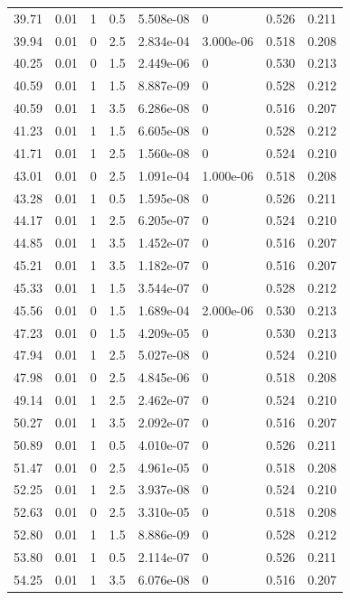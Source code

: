 \documentclass[preview]{standalone}
\begin{document}
{{{\begin{tabular}{L{1.2cm}C{1.2cm} C{0.3cm}C{0.5cm} C{1.4cm}C{1.4cm} C{1.4cm}C{1.4cm}}
  39.71  &  0.01  & 1     & 0.5 &  5.508e-08  & 0  & 0.526 &  0.211   \\ 
  39.94  &  0.01  & 0     & 2.5 &  2.834e-04  & 3.000e-06  & 0.518 &  0.208   \\ 
  40.25  &  0.01  & 0     & 1.5 &  2.449e-06  & 0  & 0.530 &  0.213   \\ 
  40.59  &  0.01  & 1     & 1.5 &  8.887e-09  & 0  & 0.528 &  0.212   \\ 
  40.59  &  0.01  & 1     & 3.5 &  6.286e-08  & 0  & 0.516 &  0.207   \\ 
  41.23  &  0.01  & 1     & 1.5 &  6.605e-08  & 0  & 0.528 &  0.212   \\ 
  41.71  &  0.01  & 1     & 2.5 &  1.560e-08  & 0  & 0.524 &  0.210   \\ 
  43.01  &  0.01  & 0     & 2.5 &  1.091e-04  & 1.000e-06  & 0.518 &  0.208   \\ 
  43.28  &  0.01  & 1     & 0.5 &  1.595e-08  & 0  & 0.526 &  0.211   \\ 
  44.17  &  0.01  & 1     & 2.5 &  6.205e-07  & 0  & 0.524 &  0.210   \\ 
  44.85  &  0.01  & 1     & 3.5 &  1.452e-07  & 0  & 0.516 &  0.207   \\ 
  45.21  &  0.01  & 1     & 3.5 &  1.182e-07  & 0  & 0.516 &  0.207   \\ 
  45.33  &  0.01  & 1     & 1.5 &  3.544e-07  & 0  & 0.528 &  0.212   \\ 
  45.56  &  0.01  & 0     & 1.5 &  1.689e-04  & 2.000e-06  & 0.530 &  0.213   \\ 
  47.23  &  0.01  & 0     & 1.5 &  4.209e-05  & 0  & 0.530 &  0.213   \\ 
  47.94  &  0.01  & 1     & 2.5 &  5.027e-08  & 0  & 0.524 &  0.210   \\ 
  47.98  &  0.01  & 0     & 2.5 &  4.845e-06  & 0  & 0.518 &  0.208   \\ 
  49.14  &  0.01  & 1     & 2.5 &  2.462e-07  & 0  & 0.524 &  0.210   \\ 
  50.27  &  0.01  & 1     & 3.5 &  2.092e-07  & 0  & 0.516 &  0.207   \\ 
  50.89  &  0.01  & 1     & 0.5 &  4.010e-07  & 0  & 0.526 &  0.211   \\ 
  51.47  &  0.01  & 0     & 2.5 &  4.961e-05  & 0  & 0.518 &  0.208   \\ 
  52.25  &  0.01  & 1     & 2.5 &  3.937e-08  & 0  & 0.524 &  0.210   \\ 
  52.63  &  0.01  & 0     & 2.5 &  3.310e-05  & 0  & 0.518 &  0.208   \\ 
  52.80  &  0.01  & 1     & 1.5 &  8.886e-09  & 0  & 0.528 &  0.212   \\ 
  53.80  &  0.01  & 1     & 0.5 &  2.114e-07  & 0  & 0.526 &  0.211   \\ 
  54.25  &  0.01  & 1     & 3.5 &  6.076e-08  & 0  & 0.516 &  0.207   \\ 
\hline 
\end{tabular} 

}}}
\end{document}
